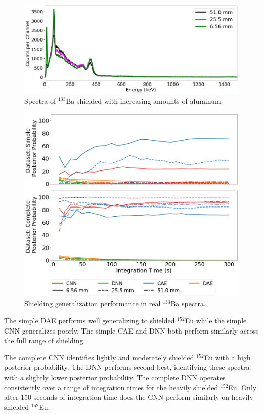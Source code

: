 \begin{figure}[H]
	\centering
	\includegraphics[width=1.0\linewidth]{images/shielded_ba133}	\caption{Spectra of $^{133}$Ba shielded with increasing amounts of aluminum.}
	\label{fig:shielded_ba133}
\end{figure}

\begin{figure}[H]
	\centering
	\includegraphics[width=0.9\linewidth]{images/alum_ba133}	\caption{Shielding generalization performance in real $^{133}$Ba spectra.}
	\label{fig:alum_ba133}
\end{figure}



The simple DAE performs well generalizing to shielded $^{152}$Eu while the simple CNN generalizes poorly. The simple CAE and DNN both perform similarly across the full range of shielding. 

The complete CNN identifies lightly and moderately shielded $^{152}$Eu with a high posterior probability. The DNN performs second best, identifying these spectra with a slightly lower posterior probability. The complete DNN operates consistently over a range of integration times for the heavily shielded $^{152}$Eu. Only after 150 seconds of integration time does the CNN perform similarly on heavily shielded $^{152}$Eu. %



